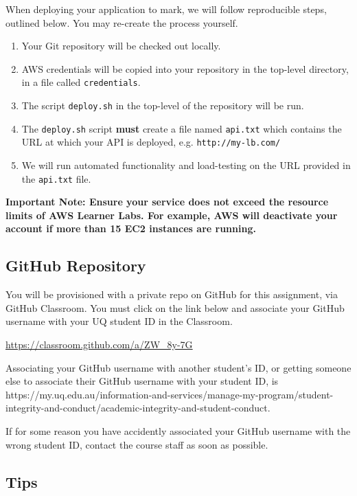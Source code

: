 \documentclass{csse4400}
\begin{document}
When deploying your application to mark,
we will follow reproducible steps, outlined below.
You may re-create the process yourself.

\begin{enumerate}
  \item Your Git repository will be checked out locally.
  \item AWS credentials will be copied into your repository in the top-level directory,
  in a file called \texttt{credentials}.
  \item The script \texttt{deploy.sh} in the top-level of the repository will be run.
  \item The \texttt{deploy.sh} script \textbf{must} create a file named \texttt{api.txt} which contains the URL at which your API is deployed, e.g. \texttt{http://my-lb.com/}
  \item We will run automated functionality and load-testing on the URL provided in the \texttt{api.txt} file.
\end{enumerate}

\textbf{Important Note: 
Ensure your service does not exceed the resource limits of AWS Learner Labs.
For example, AWS will deactivate your account if more than 15 EC2 instances are running.}

\subsection{GitHub Repository}\label{sec:github}
You will be provisioned with a private repo on GitHub for this assignment, via GitHub Classroom.
You must click on the link below and associate your GitHub username with your UQ student ID in the Classroom.

\url{https://classroom.github.com/a/ZW_8y-7G}

\noindent
Associating your GitHub username with another student's ID,
or getting someone else to associate their GitHub username with your student ID, is 
{https://my.uq.edu.au/information-and-services/manage-my-program/student-integrity-and-conduct/academic-integrity-and-student-conduct}.

If for some reason you have accidently associated your GitHub username with the wrong student ID,
contact the course staff as soon as possible.

\subsection{Tips}
\end{document}
